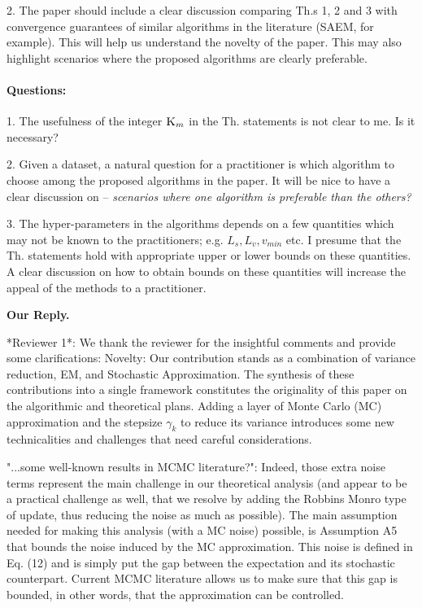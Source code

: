 \documentclass[anon,12pt]{alt2021} %
\begin{document}
2. The paper should include a clear discussion comparing Th.s 1, 2 and 3 with convergence guarantees of similar algorithms
in the literature (SAEM, for example). This will help us understand the novelty of the paper. This may also highlight scenarios where
the proposed algorithms are clearly preferable.


\paragraph{Questions:}


1. The usefulness of the integer $\textsc{K}_m$ in the Th. statements is not clear to me. Is it necessary?

2. Given a dataset, a natural question for a practitioner is which algorithm to choose among the proposed algorithms in the paper.
It will be nice to have a clear discussion on -- \textit{scenarios where one algorithm is preferable than the others?}

3. The hyper-parameters in the algorithms depends on a few quantities which may not be known to the practitioners; e.g. $L_s, L_v, v_{min}$ etc. I
presume that the Th. statements hold with appropriate upper or lower bounds on these quantities. A clear discussion on how to obtain
bounds on these quantities will increase the appeal of the methods to a practitioner.


\vspace{0.1in}
\textbf{Our Reply.}

*Reviewer 1*: 
We thank the reviewer for the insightful comments and provide some clarifications:
Novelty: Our contribution stands as a combination of variance reduction, EM, and Stochastic Approximation. 
The synthesis of these contributions into a single framework constitutes the originality of this paper on the algorithmic and theoretical plans.
Adding a layer of Monte Carlo (MC) approximation and the stepsize $\gamma_k$ to reduce its variance introduces some new technicalities and challenges that need careful considerations.

"...some well-known results in MCMC literature?": Indeed, those extra noise terms represent the main challenge in our theoretical analysis (and appear to be a practical challenge as well, that we resolve by adding the Robbins Monro type of update, thus reducing the noise as much as possible). The main assumption needed for making this analysis (with a MC noise) possible, is Assumption A5 that bounds the noise induced by the MC approximation. This noise is defined in Eq. (12) and is simply put the gap between the expectation and its stochastic counterpart. Current MCMC literature allows us to make sure that this gap is bounded, in other words, that the approximation can be controlled.
\end{document}
